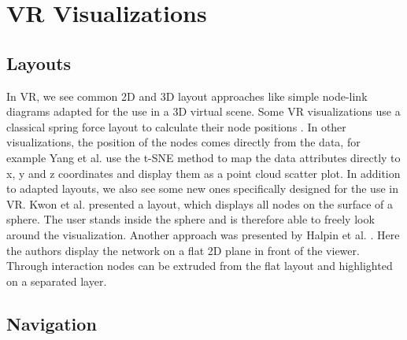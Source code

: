 \section{VR Visualizations}

\subsection{Layouts}

In VR, we see common 2D and 3D layout approaches like simple node-link diagrams adapted for the use in a 3D virtual scene. 
Some VR visualizations use a classical spring force layout to calculate their node positions \cite{drogemuller_examining_2020} \cite{sorger_immersive_2019}.
In other visualizations, the position of the nodes comes directly from the data, for example Yang et al. \cite{yang_embodied_2020} use the t-SNE method \cite{maaten_visualizing_2008} to map the data attributes directly to x, y and z coordinates and display them as a point cloud scatter plot.
In addition to adapted layouts, we also see some new ones specifically designed for the use in VR. Kwon et al. \cite{kwon_study_2016} presented a layout, which displays all nodes on the surface of a sphere. The user stands inside the sphere and is therefore able to freely look around the visualization. Another approach was presented by Halpin et al. \cite{halpin_exploring_2008}. Here the authors display the network on a flat 2D plane in front of the viewer. Through interaction nodes can be extruded from the flat layout and highlighted on a separated layer.     

\subsection{Navigation}

